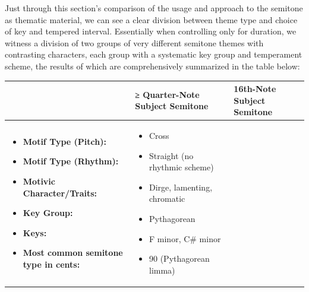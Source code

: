     Just through this section's comparison of the usage and approach to the
semitone as thematic material, we can see a clear division between theme
type and choice of key and tempered interval. Essentially when
controlling only for duration, we witness a division of two groups of
very different semitone themes with contrasting characters, each group
with a systematic key group and temperament scheme, the results of which
are comprehensively summarized in the table below:
\begin{table}[H]
\begin{singlespace}
\small
\centering
\begin{tabularx}{5.5in}{|>{\RaggedRight}X|>{\RaggedRight}X|>{\RaggedRight}X|}
\hline
                                  & \textbf{ ≥ Quarter-Note \newline Subject Semitone} & \textbf{16th-Note \newline Subject Semitone} \\
\hline
\vspace{-1em}
\begin{itemize}[leftmargin=0cm]
    \item[] \textbf{Motif Type (Pitch):                          }
    \item[] \textbf{Motif Type (Rhythm): \newline ~              }
    \item[] \textbf{Motivic \newline \mbox{Character/Traits}:    }
    \item[] \textbf{Key Group:                                   }
    \item[] \textbf{Keys:                                        }
    \item[] \textbf{Most common semitone \newline type in cents: }
\end{itemize}

                                  &

\vspace{-1em}
\begin{itemize}[leftmargin=*]
\item Cross
\item Straight \newline (no rhythmic scheme)
\item Dirge, lamenting, \newline chromatic
\item Pythagorean
\item F minor, C\# minor
\item 90 (Pythagorean limma)
\end{itemize}
                                  &


\end{tabularx}
\end{singlespace}
\end{table}
